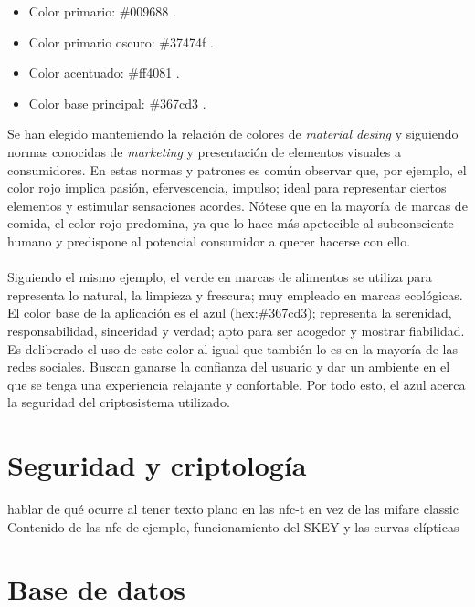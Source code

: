 \documentclass[../PFC.tex]{subfiles}
\begin{document}
\begin{itemize}
\item{Color primario: \#009688 .}
\item{Color primario oscuro: \#37474f .}
\item{Color acentuado: \#ff4081 .}
\item{Color base principal: \#367cd3 .}
\end{itemize}

Se han elegido manteniendo la relación de colores de \textit{material desing} y siguiendo normas conocidas de \textit{marketing} y presentación de elementos visuales a consumidores. En estas normas y patrones es común observar que, por ejemplo, el color rojo implica pasión, efervescencia, impulso; ideal para representar ciertos elementos y estimular sensaciones acordes. Nótese que en la mayoría de marcas de comida, el color rojo predomina, ya que lo hace más apetecible al subconsciente humano y predispone al potencial consumidor a querer hacerse con ello. 
\\\\
Siguiendo el mismo ejemplo, el verde en marcas de alimentos se utiliza para representa lo natural, la limpieza y frescura; muy empleado en marcas ecológicas. El color base de la aplicación es el azul (hex:\#367cd3); representa la serenidad, responsabilidad, sinceridad y verdad; apto para ser acogedor y mostrar fiabilidad. Es deliberado el uso de este color al igual que también lo es en la mayoría de las redes sociales. Buscan ganarse la confianza del usuario y dar un ambiente en el que se tenga una experiencia relajante y confortable. Por todo esto, el azul acerca la seguridad del criptosistema utilizado.

\section{Seguridad y criptología}
\label{App:Seguridad y criptología}

hablar de qué ocurre al tener texto plano en las nfc-t en vez de las mifare classic
Contenido de las nfc de ejemplo, funcionamiento del SKEY y las curvas elípticas

\section{Base de datos}
\label{App:Base de datos}
\end{document}

